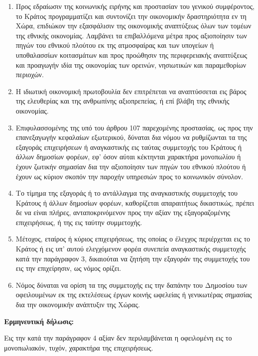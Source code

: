 \documentclass[twoside, a4paper, 10pt]{article}
\begin{document}
\begin{multicols}{2}
\begin{enumerate}
\begin{BigQuote}
\begin{enumerate}
  \item[1.] Προς εδραίωσιν της κοινωνικής ειρήνης και προστασίαν του γενικού συμφέροντος, το Κράτος προγραμματίζει και συντονίζει την οικονομικήν δραστηριότητα εν τη Χώρα, επιδιώκον την εξασφάλισιν της οικονομικής αναπτύξεως όλων των τομέων της εθνικής οικονομίας. Λαμβάνει τα επιβαλλόμενα μέτρα προς αξιοποίησιν των πηγών του εθνικού πλούτου εκ της ατμοσφαίρας και των υπογείων ή υποθαλασσίων κοιτασμάτων και προς προώθησιν της περιφερειακής αναπτύξεως και προαγωγήν ιδία της οικονομίας των ορεινών, νησιωτικών και παραμεθορίων περιοχών.
  \item[2.] Η ιδιωτική οικονομική πρωτοβουλία δεν επιτρέπεται να αναπτύσσεται εις βάρος της ελευθερίας και της ανθρωπίνης αξιοπρεπείας, ή επί βλάβη της εθνικής οικονομίας.
  \item[3.] Επιφυλασσομένης της υπό του άρθρου 107 παρεχομένης προστασίας, ως προς την επανεξαγωγήν κεφαλαίων εξωτερικού, δύναται δια νόμου να ρυθμίζωνται τα της εξαγοράς επιχειρήσεων ή αναγκαστικής εις ταύτας συμμετοχής του Κράτους ή άλλων δημοσίων φορέων, εφ' όσον αύται κέκτηνται χαρακτήρα μονοπωλίου ή έχουν ζωτικήν σημασίαν δια την αξιοποίησιν των πηγών του εθνικού πλούτου ή έχουν ως κύριον σκοπόν την παροχήν υπηρεσιών προς το κοινωνικόν σύνολον.
  \item[4.] Το τίμημα της εξαγοράς ή το αντάλλαγμα της αναγκαστικής συμμετοχής του Κράτους ή άλλων δημοσίων φορέων, καθορίζεται απαραιτήτως δικαστικώς, πρέπει δε να είναι πλήρες, ανταποκρινόμενον προς την αξίαν της εξαγοραζομένης επιχειρήσεως, ή της εις ταύτην συμμετοχής.
  \item[5.] Μέτοχος, εταίρος ή κύριος επιχειρήσεως, της οποίας ο έλεγχος περιέρχεται εις το Κράτος ή εις υπ' αυτού ελεγχόμενον φορέα συνεπεία αναγκαστικής συμμετοχής κατά την παράγραφον 3, δικαιούται να ζητήση την εξαγοράν της συμμετοχής του εις την επιχείρησιν, ως νόμος ορίζει.
  \item[6.] Νόμος δύναται να ορίση τα της συμμετοχής εις την δαπάνην του Δημοσίου των οφειλουμένων εκ της εκτελέσεως έργων κοινής ωφελείας ή γενικωτέρας σημασίας δια την οικονομικήν ανάπτυξιν της Χώρας.
\end{enumerate}
\textbf{Ερμηνευτική δήλωσις:}

Εις την κατά την παράγραφον 4 αξίαν δεν περιλαμβάνεται  η οφειλομένη εις το μονοπωλιακόν, τυχόν, χαρακτήρα της επιχειρήσεως.


\end{BigQuote}
\end{enumerate}
\end{multicols}
\end{document}
